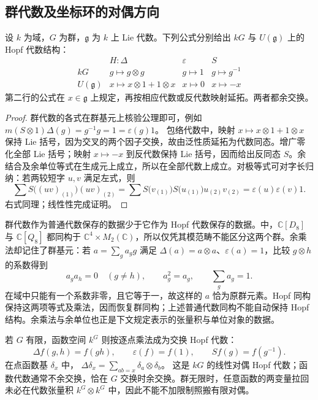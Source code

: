 \subsection{群代数及坐标环的对偶方向}
\label{b5:subsec:2101:02}

\begin{proposition}\label{b5:prop:group-enveloping-hopf}
	设 \(k\) 为域，\(G\) 为群，\(\mathfrak g\) 为 \(k\) 上 Lie 代数。下列公式分别给出 \(kG\) 与 \(U(\mathfrak g)\) 上的 Hopf 代数结构：
	\[
		\begin{array}{c|ccc}
			&H:\Delta&\varepsilon&S\\ \hline kG&g\mapsto g\otimes g&g\mapsto1&g\mapsto g^{-1}\\
			U(\mathfrak g)&x\mapsto x\otimes1+1\otimes x&x\mapsto0&x\mapsto-x
		\end{array}
	\]
	第二行的公式在 \(x\in\mathfrak g\) 上规定，再按相应代数或反代数映射延拓。两者都余交换。
\end{proposition}
\begin{proof}
	群代数的各式在群基元上核验公理即可，例如 \(m(S\otimes1)\Delta(g)=g^{-1}g=1=\varepsilon(g)1\)。 包络代数中，映射 \(x\mapsto x\otimes1+1\otimes x\) 保持 Lie 括号，因为交叉的两个因子交换，故由泛性质延拓为代数同态。增广零化全部 Lie 括号；映射 \(x\mapsto-x\) 到反代数保持 Lie 括号，因而给出反同态 \(S\)。余结合及余单位等式在生成元上成立，所以在全部代数上成立。对极等式可对字长归纳：若两较短字 \(u,v\) 满足左式，则
	\[
		\sum S\bigl((uv)_{(1)}\bigr)(uv)_{(2)} =\sum S\bigl(v_{(1)}\bigr)S\bigl(u_{(1)}\bigr)u_{(2)}v_{(2)} =\varepsilon(u)\varepsilon(v)1.
	\]
	右式同理；线性性完成证明。
\end{proof}
群代数作为普通代数保存的数据少于它作为 Hopf 代数保存的数据。中，\(\mathbb C[D_8]\) 与 \(\mathbb C[Q_8]\) 都同构于 \(\mathbb C^4\times M_2(\mathbb C)\)，所以仅凭其模范畴不能区分这两个群。余乘法却记住了群基元：若 \(a=\sum_g a_gg\) 满足 \(\Delta(a)=a\otimes a\)、\(\varepsilon(a)=1\)，比较 \(g\otimes h\) 的系数得到
\[
	a_ga_h=0\quad(g\ne h),\qquad a_g^2=a_g, \qquad \sum_g a_g=1.
\]
在域中只能有一个系数非零，且它等于一，故这样的 \(a\) 恰为原群元素。Hopf 同构保持这两项等式及乘法，因而恢复群同构；上述普通代数同构不能自动保持 Hopf 结构。余乘法与余单位也正是下文规定表示的张量积与单位对象的数据。

若 \(G\) 有限，函数空间 \(k^G\) 则按逐点乘法成为交换 Hopf 代数：
\[
	\Delta f(g,h)=f(gh),\qquad \varepsilon(f)=f(1),\qquad Sf(g)=f(g^{-1}).
\]
在点函数基 \(\delta_x\) 中， \(\Delta\delta_x=\sum_{ab=x}\delta_a\otimes\delta_b\)。 这是 \(kG\) 的线性对偶 Hopf 代数；函数代数通常不余交换，恰在 \(G\) 交换时余交换。群无限时，任意函数的两变量拉回未必在代数张量积 \(k^G\otimes k^G\) 中，因此不能不加限制照搬有限对偶。

